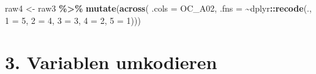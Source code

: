 \documentclass[
]{article}
\newenvironment{Shaded}{\begin{snugshade}}{\end{snugshade}}
\newcommand{\AttributeTok}[1]{\textcolor[rgb]{0.13,0.29,0.53}{#1}}
\newcommand{\DecValTok}[1]{\textcolor[rgb]{0.00,0.00,0.81}{#1}}
\newcommand{\FunctionTok}[1]{\textcolor[rgb]{0.13,0.29,0.53}{\textbf{#1}}}
\newcommand{\NormalTok}[1]{#1}
\newcommand{\OtherTok}[1]{\textcolor[rgb]{0.56,0.35,0.01}{#1}}
\newcommand{\SpecialCharTok}[1]{\textcolor[rgb]{0.81,0.36,0.00}{\textbf{#1}}}
\newcommand{\StringTok}[1]{\textcolor[rgb]{0.31,0.60,0.02}{#1}}
\begin{document}
\begin{Shaded}
\begin{Highlighting}[]
\NormalTok{raw4 }\OtherTok{\textless{}{-}}\NormalTok{ raw3 }\SpecialCharTok{\%\textgreater{}\%} 
  \FunctionTok{mutate}\NormalTok{(}\FunctionTok{across}\NormalTok{(}
    \AttributeTok{.cols =}\NormalTok{ OC\_A02,}
    \AttributeTok{.fns =} \SpecialCharTok{\textasciitilde{}}\NormalTok{dplyr}\SpecialCharTok{::}\FunctionTok{recode}\NormalTok{(.,}
                    \StringTok{\textasciigrave{}}\AttributeTok{1}\StringTok{\textasciigrave{}} \OtherTok{=} \DecValTok{5}\NormalTok{,}
                    \StringTok{\textasciigrave{}}\AttributeTok{2}\StringTok{\textasciigrave{}} \OtherTok{=} \DecValTok{4}\NormalTok{,}
                    \StringTok{\textasciigrave{}}\AttributeTok{3}\StringTok{\textasciigrave{}} \OtherTok{=} \DecValTok{3}\NormalTok{,}
                    \StringTok{\textasciigrave{}}\AttributeTok{4}\StringTok{\textasciigrave{}} \OtherTok{=} \DecValTok{2}\NormalTok{,}
                    \StringTok{\textasciigrave{}}\AttributeTok{5}\StringTok{\textasciigrave{}} \OtherTok{=} \DecValTok{1}\NormalTok{)))}
\end{Highlighting}
\end{Shaded}

\section{3. Variablen umkodieren}\label{variablen-umkodieren}
\end{document}
